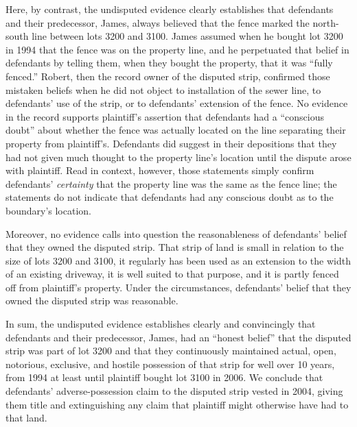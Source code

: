 Here, by contrast, the undisputed evidence clearly establishes that defendants
and their predecessor, James, always believed that the fence marked the
north-south line between lots 3200 and 3100. James assumed when he bought lot
3200 in 1994 that the fence was on the property line, and he perpetuated that
belief in defendants by telling them, when they bought the property, that it
was ``fully fenced.'' Robert, then the record owner of the disputed strip,
confirmed those mistaken beliefs when he did not object to installation of the
sewer line, to defendants' use of the strip, or to defendants' extension of the
fence. No evidence in the record supports plaintiff's assertion that defendants
had a ``conscious doubt'' about whether the fence was actually located on the
line separating their property from plaintiff's. Defendants did suggest in
their depositions that they had not given much thought to the property line's
location until the dispute arose with plaintiff. Read in context, however,
those statements simply confirm defendants' \textit{certainty} that the
property line was the same as the fence line; the statements do not indicate
that defendants had any conscious doubt as to the boundary's location.

Moreover, no evidence calls into question the reasonableness of defendants'
belief that they owned the disputed strip. That strip of land is small in
relation to the size of lots 3200 and 3100, it regularly has been used as an
extension to the width of an existing driveway, it is well suited to that
purpose, and it is partly fenced off from plaintiff's property. Under the
circumstances, defendants' belief that they owned the disputed strip was
reasonable.

In sum, the undisputed evidence establishes clearly and convincingly that
defendants and their predecessor, James, had an ``honest belief'' that the
disputed strip was part of lot 3200 and that they continuously maintained
actual, open, notorious, exclusive, and hostile possession of that strip for
well over 10 years, from 1994 at least until plaintiff bought lot 3100 in
2006. We conclude
that defendants' adverse-possession claim to the disputed strip vested in 2004,
giving them title and extinguishing any claim that plaintiff might otherwise
have had to that land. 

